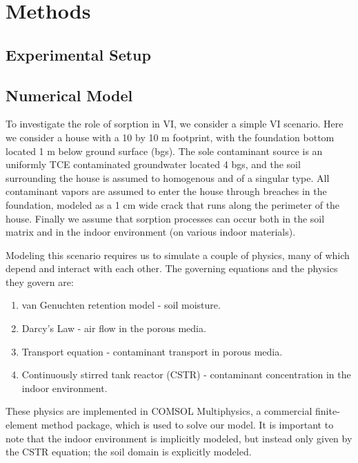\section{Methods}\label{sec:methods}


\subsection{Experimental Setup}\label{sec:experiment}




\subsection{Numerical Model}\label{sec:model}

To investigate the role of sorption in VI, we consider a simple VI scenario.
Here we consider a house with a 10 by 10 m footprint, with the foundation bottom located 1 m below ground surface (bgs).
The sole contaminant source is an uniformly TCE contaminated groundwater located 4 bgs, and the soil surrounding the house is assumed to homogenous and of a singular type.
All contaminant vapors are assumed to enter the house through breaches in the foundation, modeled as a 1 cm wide crack that runs along the perimeter of the house.
Finally we assume that sorption processes can occur both in the soil matrix and in the indoor environment (on various indoor materials).\par

Modeling this scenario requires us to simulate a couple of physics, many of which depend and interact with each other.
The governing equations and the physics they govern are:
\begin{enumerate}
  \item van Genuchten retention model - soil moisture.
  \item Darcy's Law - air flow in the porous media.
  \item Transport equation - contaminant transport in porous media.
  \item Continuously stirred tank reactor (CSTR) - contaminant concentration in the indoor environment.
\end{enumerate}
These physics are implemented in COMSOL Multiphysics, a commercial finite-element method package, which is used to solve our model.
It is important to note that the indoor environment is implicitly modeled, but instead only given by the CSTR equation; the soil domain is explicitly modeled.\par

